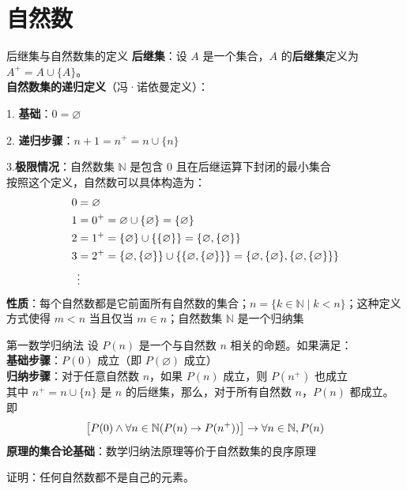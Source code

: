 \documentclass[lang=cn,11pt]{elegantbook}
\begin{document}
\section{自然数}
\begin{definition}{后继集与自然数集的定义}
\textbf{后继集}：设 $A$ 是一个集合，$A$ 的\textbf{后继集}定义为 $A^{+} = A \cup \{A\}$。\\
\textbf{自然数集的递归定义}（冯·诺依曼定义）：

1. \textbf{基础}：$0 = \varnothing$

2. \textbf{递归步骤}：$n + 1 = n^{+} = n \cup \{n\}$

3.\textbf{极限情况}：自然数集 $\mathbb{N}$ 是包含 $0$ 且在后继运算下封闭的最小集合\\
按照这个定义，自然数可以具体构造为：\vspace{-10pt}
\begin{align*}
0 &= \varnothing \\
1 &= 0^{+} = \varnothing \cup \{\varnothing\} = \{\varnothing\} \\
2 &= 1^{+} = \{\varnothing\} \cup \{\{\varnothing\}\} = \{\varnothing, \{\varnothing\}\} \\
3 &= 2^{+} = \{\varnothing, \{\varnothing\}\} \cup \{\{\varnothing, \{\varnothing\}\}\} = \{\varnothing, \{\varnothing\}, \{\varnothing, \{\varnothing\}\}\} \\
&\vdots
\vspace{-10pt}\end{align*}
\textbf{性质}：每个自然数都是它前面所有自然数的集合；$n=\{k\in\mathbb{N}\mid k<n\}$；这种定义方式使得 $m < n$ 当且仅当 $m \in n$；自然数集 $\mathbb{N}$ 是一个归纳集
\end{definition}
\begin{definition}{第一数学归纳法}
    设 $P(n)$ 是一个与自然数 $n$ 相关的命题。如果满足：\\
    \textbf{基础步骤}：$P(0)$ 成立（即 $P(\varnothing)$ 成立）\\
    \textbf{归纳步骤}：对于任意自然数 $n$，如果 $P(n)$ 成立，则 $P(n^{+})$ 也成立\\
    其中 $n^{+} = n \cup \{n\}$ 是 $n$ 的后继集，那么，对于所有自然数 $n$，$P(n)$ 都成立。即\vspace{-10pt}
\[\bigl[P(0) \land \forall n \in \mathbb{N}(P(n) \rightarrow P(n^{+}))\bigr] \rightarrow \forall n \in \mathbb{N}, P(n)\vspace{-10pt}\]
\textbf{原理的集合论基础}：数学归纳法原理等价于自然数集的良序原理
\end{definition}
证明：任何自然数都不是自己的元素。
\end{document}
